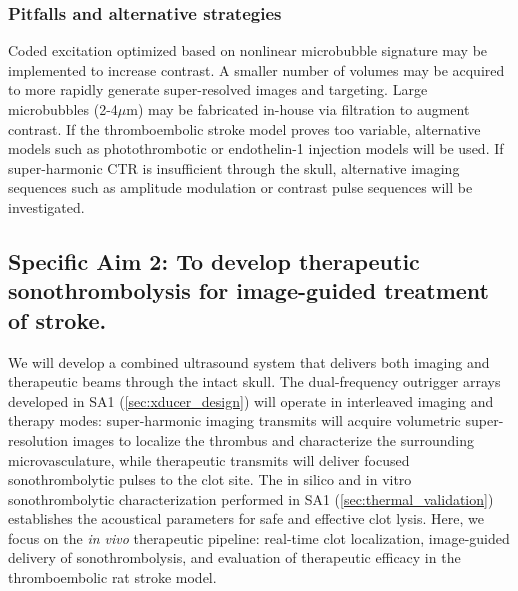 \subsubsection{Pitfalls and alternative strategies} 
Coded excitation optimized based on nonlinear microbubble signature may be implemented to increase contrast. A smaller number of volumes may be acquired to more rapidly generate super-resolved images and targeting. Large microbubbles (2-4$\mu$m) may be fabricated in-house via filtration to augment contrast. If the thromboembolic stroke model proves too variable, alternative models such as photothrombotic or endothelin-1 injection models will be used. If super-harmonic CTR is insufficient through the skull, alternative imaging sequences such as amplitude modulation or contrast pulse sequences will be investigated.

\subsection{Specific Aim 2: To develop therapeutic sonothrombolysis for image-guided treatment of stroke.}
We will develop a combined ultrasound system that delivers both imaging and therapeutic beams through the intact skull. The dual-frequency outrigger arrays developed in SA1 (\ref{sec:xducer_design}) will operate in interleaved imaging and therapy modes: super-harmonic imaging transmits will acquire volumetric super-resolution images to localize the thrombus and characterize the surrounding microvasculature, while therapeutic transmits will deliver focused sonothrombolytic pulses to the clot site. The in silico and in vitro sonothrombolytic characterization performed in SA1 (\ref{sec:thermal_validation}) establishes the acoustical parameters for safe and effective clot lysis. Here, we focus on the \textit{in vivo} therapeutic pipeline: real-time clot localization, image-guided delivery of sonothrombolysis, and evaluation of therapeutic efficacy in the thromboembolic rat stroke model.

